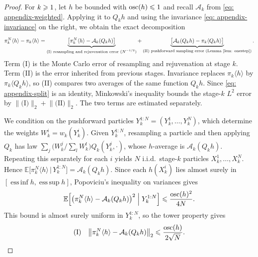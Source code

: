 \documentclass{article}
\begin{document}
\begin{proof}
For $k\geqslant1$, let $h$ be bounded with $\operatorname{osc}(h)\leqslant1$ and recall $\mathcal A_k$ from \eqref{eq: appendix-weighted}. Applying it to $Q_kh$ and using the invariance \eqref{eq: appendix-invariance} on the right, we obtain the exact decomposition
\begin{equation}
    \pi_k^N\langle h\rangle-\pi_k\langle h\rangle
    = \underbrace{\bigl[\pi_k^N\langle h\rangle-\mathcal A_k(Q_kh)\bigr]}_{\text{(I) resampling and rejuvenation error ($N^{-1/2}$)}}
    + \underbrace{\bigl[\mathcal A_k(Q_kh)-\pi_k\langle Q_kh\rangle\bigr]}_{\text{(II) pushforward sampling error (Lemma~\ref{lem: onestep})}} .
    \label{eq: appendix-split}
\end{equation}
Term (I) is the Monte Carlo error of resampling and rejuvenation at stage $k$. Term (II) is the error inherited from previous stages. Invariance replaces $\pi_k\langle h\rangle$ by $\pi_k\langle Q_kh\rangle$, so (II) compares two averages of the same function $Q_kh$. Since \eqref{eq: appendix-split} is an identity, Minkowski's inequality bounds the stage-$k$ $L^2$ error by $\lVert\text{(I)}\rVert_2+\lVert\text{(II)}\rVert_2$. The two terms are estimated separately.

We condition on the pushforward particles $Y_k^{1:N}=(Y_k^1,\dots,Y_k^N)$, which determine the weights $W_k^i=w_k(Y_k^i)$. Given $Y_k^{1:N}$, resampling a particle and then applying $Q_k$ has law $\sum_{j}\bigl(W_k^j/\sum_l W_k^l\bigr)Q_k(Y_k^j,\cdot)$, whose $h$-average is $\mathcal A_k(Q_kh)$. Repeating this separately for each $i$ yields $N$ i.i.d.\ stage-$k$ particles $X_k^1,\dots,X_k^N$.
Hence $\mathbb E\bigl[\pi_k^N\langle h\rangle\,\big|\, Y_k^{1:N}\bigr]=\mathcal A_k(Q_kh)$. Since each $h(X_k^i)$ lies almost surely in $[\operatorname{ess\,inf}h,\operatorname{ess\,sup}h]$, Popoviciu's inequality on variances gives
\begin{equation*}
    \mathbb E\Bigl[\bigl(\pi_k^N\langle h\rangle-\mathcal A_k(Q_kh)\bigr)^{2}\Bigm| Y_k^{1:N}\Bigr]
    \leqslant \frac{\operatorname{osc}(h)^{2}}{4N} .
\end{equation*}
This bound is almost surely uniform in $Y_k^{1:N}$, so the tower property gives
\begin{equation}
	\text{(I)} \quad
    \bigl\lVert\pi_k^N\langle h\rangle-\mathcal A_k(Q_kh)\bigr\rVert_2 \leqslant \frac{\operatorname{osc}(h)}{2\sqrt N} .
    \label{eq: appendix-resample}
\end{equation}


\end{proof}
\end{document}
